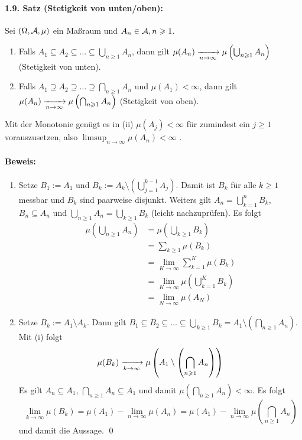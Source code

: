 \paragraph{1.9. Satz (Stetigkeit von unten/oben):}Sei $(\Omega,\mathcal{A},\mu)$ ein Ma\ss{}raum und $A_n\in\mathcal{A},n\geqslant1$.
\begin{enumerate}[label=(\roman*)]
    \item Falls $A_1\subseteq A_2\subseteq\hdots\subseteq\bigcup_{n\geq1}A_n$, dann gilt $\mu(A_n)\nto{}{n\to\infty}\mu\left(\bigcup_{n\geq1}A_n\right)$ (Stetigkeit von unten).
    \item Falls $A_1\supseteq A_2\supseteq\hdots\supseteq\bigcap_{n\geq1}A_n$ und $\mu(A_1)<\infty$, dann gilt $\mu(A_n)\nto{}{n\to\infty}\mu\left(\bigcap_{n\geq1}A_n\right)$ (Stetigkeit von oben).
\end{enumerate}
Mit der Monotonie gen\"ugt es in (ii) $\mu(A_j)<\infty$ f\"ur zumindest ein $j\geq1$ vorauszusetzen, also $\limsup_{n\to\infty}\mu(A_n)<\infty$ .

\paragraph{Beweis:}
\begin{enumerate}[label=(\roman*)]
    \item Setze $B_1:=A_1$ und $B_k:=A_k\setminus\left(\bigcup_{j=1}^{k-1}A_j\right)$. Damit ist $B_k$ f\"ur alle $k\geq1$ messbar und $B_k$ sind paarweise disjunkt. Weiters gilt $A_n=\bigcup_{k=1}^n B_k$, $B_n\subseteq A_n$ und $\bigcup_{n\geq1}A_n=\bigcup_{k\geq1}B_k$ (leicht nachzupr\"ufen). Es folgt
    \begin{align*}
        \mu\left(\bigcup_{n\geq1}A_n\right)&=\mu\left(\bigcup_{k\geq1}B_k\right)\\
        &=\sum_{k\geq1}\mu(B_k)\\
        &=\lim_{K\to\infty}\sum_{k=1}^K\mu(B_k)\\
        &=\lim_{K\to\infty}\mu\left(\bigcup_{k=1}^K B_k\right)\\
        &=\lim_{N\to\infty}\mu(A_N)
    \end{align*}
    \item Setze $B_k:=A_1\setminus A_k$. Dann gilt $B_1\subseteq B_2\subseteq\hdots\subseteq\bigcup_{k\geq1}B_k=A_1\setminus\left(\bigcap_{n\geq1}A_n\right)$. Mit (i) folgt
    $$\mu(B_k)\nto{}{k\to\infty}\mu\left(A_1\setminus\left(\bigcap_{n\geq1}A_n\right)\right)$$
    Es gilt $A_n\subseteq A_1$, $\bigcap_{n\geq1}A_n\subseteq A_1$ und damit $\mu\left(\bigcap_{n\geq1}A_n\right)<\infty$. Es folgt 
    $$\lim_{k\to\infty}\mu(B_k)=\mu(A_1)-\lim_{n\to\infty}\mu(A_n)=\mu(A_1)-\lim_{n\to\infty}\mu\left(\bigcap_{n\geq1}A_n\right)$$
    und damit die Aussage. \qed
\end{enumerate}

